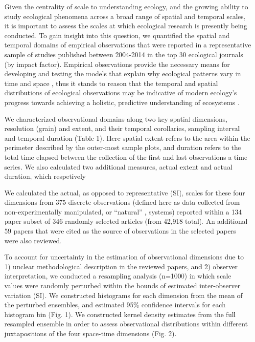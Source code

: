 \documentclass[12pt]{article}
\begin{document}
Given the centrality of scale to understanding ecology, and the growing ability to study ecological phenomena across a broad range of spatial and temporal scales, it is important to assess the scales at which ecological research is presently being conducted. To gain insight into this question, we quantified the spatial and temporal domains of empirical observations that were reported in a representative sample of studies published between 2004-2014 in the top 30 ecological journals (by impact factor). Empirical observations provide the necessary means for developing and testing the models that explain why ecological patterns vary in time and space \cite{levin_problem_1992, tilman_ecological_1989}, thus it stands to reason that the temporal and spatial distributions of ecological observations may be indicative of modern ecology's progress towards achieving a holistic, predictive understanding of ecosystems \cite{chave_problem_2013,levin_problem_1992}. 

We characterized observational domains along two key spatial dimensions, resolution (grain) and extent, and their temporal corollaries, sampling interval and  temporal duration (Table 1). Here spatial extent refers to the area within the perimeter described by the outer-most sample plots, and duration refers to the total time elapsed between the collection of the first and last observations a time series. We also calculated two additional measures, actual extent and actual duration, which respetively   

We calculated the actual, as opposed to representative (SI), scales for these four dimensions from 375 discrete observations (defined here as data collected from non-experimentally manipulated, or ``natural'' \cite{tilman_ecological_1989}, systems) reported within a 134 paper subset of 346 randomly selected articles (from 42,918 total). An additional 59 papers that were cited as the source of observations in the selected papers were also reviewed. 

To account for uncertainty in the estimation of observational dimensions due to 1) unclear methodological description in the reviewed papers, and 2) observer interpretation, we conducted a resampling analysis (n=1000) in which scale values were randomly perturbed within the bounds of estimated inter-observer variation (SI). We constructed histograms for each dimension from the mean of the perturbed ensembles, and estimated 95\% confidence intervals for each histogram bin (Fig. 1). We constructed  kernel density estimates from the full resampled ensemble in order to assess observational distributions within different juxtapositions of the four space-time dimensions (Fig. 2). 
\end{document}

